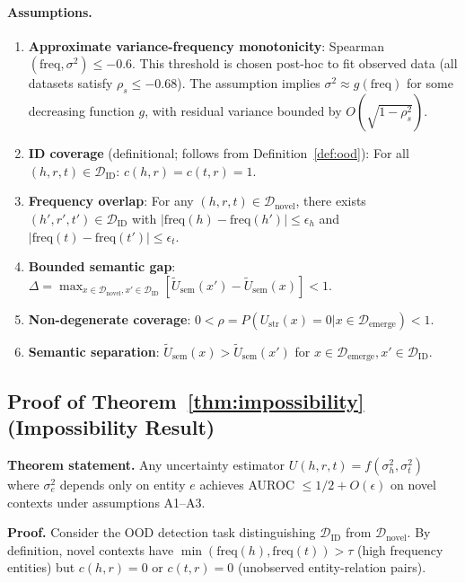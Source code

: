 \documentclass{article}
\newcommand{\freq}{\text{freq}}
\begin{document}
\paragraph{Assumptions.}
\begin{enumerate}
    \item[\textbf{(A1)}] \textbf{Approximate variance-frequency monotonicity}: Spearman$(\freq, \sigma^2) \leq {-}0.6$. This threshold is chosen post-hoc to fit observed data (all datasets satisfy $\rho_s \leq {-}0.68$). The assumption implies $\sigma^2 \approx g(\freq)$ for some decreasing function $g$, with residual variance bounded by $O(\sqrt{1-\rho_s^2})$.
    \item[\textbf{(A2)}] \textbf{ID coverage} (definitional; follows from Definition~\ref{def:ood}): For all $(h,r,t) \in \mathcal{D}_{\text{ID}}$: $c(h,r) = c(t,r) = 1$.
    \item[\textbf{(A3)}] \textbf{Frequency overlap}: For any $(h,r,t) \in \mathcal{D}_{\text{novel}}$, there exists $(h',r',t') \in \mathcal{D}_{\text{ID}}$ with $|\freq(h) - \freq(h')| \leq \epsilon_h$ and $|\freq(t) - \freq(t')| \leq \epsilon_t$.
    \item[\textbf{(A4)}] \textbf{Bounded semantic gap}: $\Delta = \max_{x \in \mathcal{D}_{\text{novel}}, x' \in \mathcal{D}_{\text{ID}}} [\tilde{U}_{\text{sem}}(x') - \tilde{U}_{\text{sem}}(x)] < 1$.
    \item[\textbf{(A5)}] \textbf{Non-degenerate coverage}: $0 < \rho = P(U_{\text{str}}(x) = 0 | x \in \mathcal{D}_{\text{emerge}}) < 1$.
    \item[\textbf{(A6)}] \textbf{Semantic separation}: $\tilde{U}_{\text{sem}}(x) > \tilde{U}_{\text{sem}}(x')$ for $x \in \mathcal{D}_{\text{emerge}}, x' \in \mathcal{D}_{\text{ID}}$.
\end{enumerate}

\subsection{Proof of Theorem~\ref{thm:impossibility} (Impossibility Result)}

\textbf{Theorem statement.} Any uncertainty estimator $U(h,r,t) = f(\sigma^2_h, \sigma^2_t)$ where $\sigma^2_e$ depends only on entity $e$ achieves AUROC $\leq 1/2 + O(\epsilon)$ on novel contexts under assumptions A1--A3.

\textbf{Proof.} Consider the OOD detection task distinguishing $\mathcal{D}_{\text{ID}}$ from $\mathcal{D}_{\text{novel}}$. By definition, novel contexts have $\min(\freq(h), \freq(t)) > \tau$ (high frequency entities) but $c(h,r) = 0$ or $c(t,r) = 0$ (unobserved entity-relation pairs).
\end{document}
